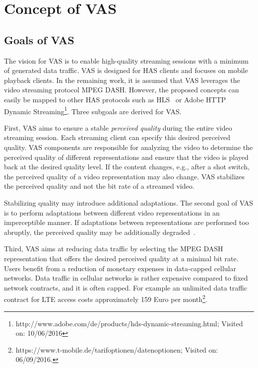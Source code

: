 \section{Concept of VAS}
\label{sec:720_DesignPrinciples}
\subsection{Goals of VAS}
The vision for \ac{VAS} is to enable high-quality streaming sessions with a minimum of generated data traffic.
\ac{VAS} is designed for \ac{HAS} clients and focuses on mobile playback clients. 
In the remaining work, it is assumed that \ac{VAS} leverages the video streaming protocol \ac{MPEG} \ac{DASH}. 
However, the proposed concepts can easily be mapped to other \ac{HAS} protocols such as \ac{HLS}~\cite{hlsDraft} or Adobe \ac{HTTP} Dynamic Streaming\footnote{http://www.adobe.com/de/products/hds-dynamic-streaming.html; Visited on: 10/06/2016}.
Three subgoals are derived for \ac{VAS}.

First, \ac{VAS} aims to ensure a stable \emph{perceived quality} during the entire video streaming session.
Each streaming client can specify this desired perceived quality.
\ac{VAS} components are responsible for analyzing the video to determine the perceived quality of different representations and ensure that the video is played back at the desired quality level.
If the content changes, e.g., after a shot switch, the perceived quality of a video representation may also change.
\ac{VAS} stabilizes the perceived quality and not the bit rate of a streamed video.

Stabilizing quality may introduce additional adaptations.
The second goal of \ac{VAS} is to perform adaptations between different video representations in an imperceptible manner.
If adaptations between representations are performed too abruptly, the perceived quality may be additionally degraded~\cite{Moorthy2012,Zink2003}.

Third, \ac{VAS} aims at reducing data traffic by selecting the \ac{MPEG} \ac{DASH} representation that offers the desired perceived quality at a minimal bit rate. 
Users benefit from a reduction of monetary expenses in data-capped cellular networks.
Data traffic in cellular networks is rather expensive compared to fixed network contracts, and it is often capped.
For example an unlimited data traffic contract for \ac{LTE} access costs approximately 159 Euro per month\footnote{https://www.t-mobile.de/tarifoptionen/datenoptionen; Visited on: 06/09/2016.}.
